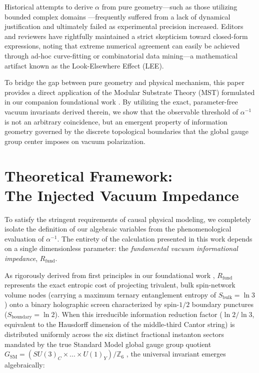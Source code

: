 \documentclass[12pt,a4paper]{article}
\begin{document}
Historical attempts to derive $\alpha$ from pure geometry—such as those utilizing bounded complex domains \cite{wyler1971}—frequently suffered from a lack of dynamical justification and ultimately failed as experimental precision increased. Editors and reviewers have rightfully maintained a strict skepticism toward closed-form expressions, noting that extreme numerical agreement can easily be achieved through ad-hoc curve-fitting or combinatorial data mining—a mathematical artifact known as the Look-Elsewhere Effect (LEE).

To bridge the gap between pure geometry and physical mechanism, this paper provides a direct application of the Modular Substrate Theory (MST) formulated in our companion foundational work \cite{peinador2026_foundational}. By utilizing the exact, parameter-free vacuum invariants derived therein, we show that the observable threshold of $\alpha^{-1}$ is not an arbitrary coincidence, but an emergent property of information geometry governed by the discrete topological boundaries that the global gauge group center imposes on vacuum polarization.


\section{Theoretical Framework:\\ The Injected Vacuum Impedance}

To satisfy the stringent requirements of causal physical modeling, we completely isolate the definition of our algebraic variables from the phenomenological evaluation of $\alpha^{-1}$. The entirety of the calculation presented in this work depends on a single dimensionless parameter: the \textit{fundamental vacuum informational impedance}, $R_{\text{fund}}$.

As rigorously derived from first principles in our foundational work \cite{peinador2026_foundational}, $R_{\text{fund}}$ represents the exact entropic cost of projecting trivalent, bulk spin-network volume nodes (carrying a maximum ternary entanglement entropy of $S_{\text{bulk}} = \ln 3$) onto a binary holographic screen characterized by spin-$1/2$ boundary punctures ($S_{\text{boundary}} = \ln 2$). When this irreducible information reduction factor ($\ln 2 / \ln 3$, equivalent to the Hausdorff dimension of the middle-third Cantor string) is distributed uniformly across the six distinct fractional instanton sectors mandated by the true Standard Model global gauge group quotient $G_{\text{SM}} = (SU(3)_C \times ... \times U(1)_Y) / \mathbb{Z}_6$ \cite{aharony2013}, the universal invariant emerges algebraically:
\end{document}
